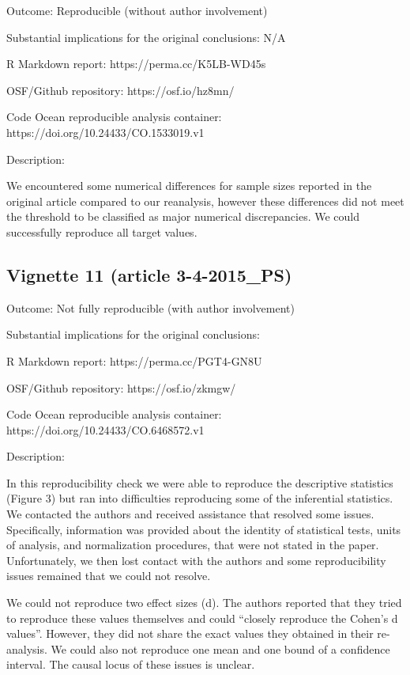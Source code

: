 \documentclass[english,,man,floatsintext]{apa6}
\begin{document}
\begin{appendix}
Outcome: Reproducible (without author involvement)

Substantial implications for the original conclusions: N/A

R Markdown report: https://perma.cc/K5LB-WD45s

OSF/Github repository: https://osf.io/hz8mn/

Code Ocean reproducible analysis container:
https://doi.org/10.24433/CO.1533019.v1

Description:

We encountered some numerical differences for sample sizes reported in
the original article compared to our reanalysis, however these
differences did not meet the threshold to be classified as major
numerical discrepancies. We could successfully reproduce all target
values.

\hypertarget{vignette-11-article-3-4-2015_ps}{%
\subsection{Vignette 11 (article
3-4-2015\_PS)}\label{vignette-11-article-3-4-2015_ps}}

Outcome: Not fully reproducible (with author involvement)

Substantial implications for the original conclusions:

R Markdown report: https://perma.cc/PGT4-GN8U

OSF/Github repository: https://osf.io/zkmgw/

Code Ocean reproducible analysis container:
https://doi.org/10.24433/CO.6468572.v1

Description:

In this reproducibility check we were able to reproduce the descriptive
statistics (Figure 3) but ran into difficulties reproducing some of the
inferential statistics. We contacted the authors and received assistance
that resolved some issues. Specifically, information was provided about
the identity of statistical tests, units of analysis, and normalization
procedures, that were not stated in the paper. Unfortunately, we then
lost contact with the authors and some reproducibility issues remained
that we could not resolve.

We could not reproduce two effect sizes (d). The authors reported that
they tried to reproduce these values themselves and could ``closely
reproduce the Cohen's d values''. However, they did not share the exact
values they obtained in their re-analysis. We could also not reproduce
one mean and one bound of a confidence interval. The causal locus of
these issues is unclear.


\end{appendix}
\end{document}
